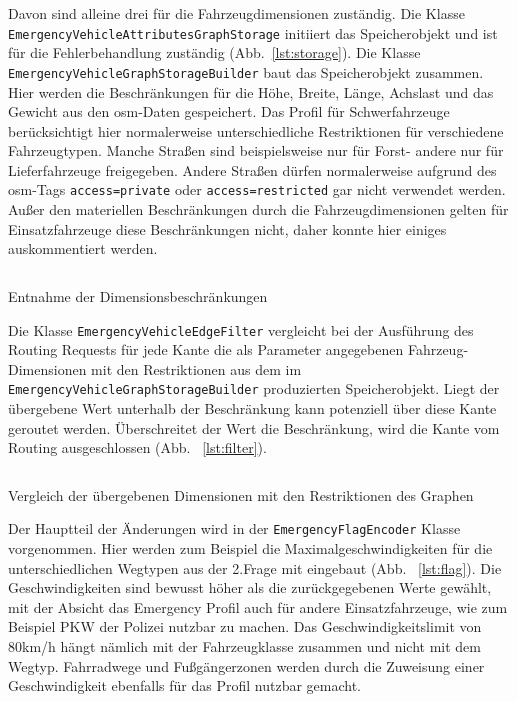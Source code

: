Davon sind alleine drei für die Fahrzeugdimensionen zuständig.
Die Klasse \texttt{EmergencyVehicleAttributesGraphStorage} initiiert das Speicherobjekt und ist für die Fehlerbehandlung zuständig (Abb.~\ref{lst:storage}).
Die Klasse \texttt{EmergencyVehicleGraphStorageBuilder} baut das Speicherobjekt zusammen.
Hier werden die Beschränkungen für die Höhe, Breite, Länge, Achslast und das Gewicht aus den \gls{osm}-Daten gespeichert.
Das Profil für Schwerfahrzeuge berücksichtigt hier normalerweise unterschiedliche Restriktionen für verschiedene Fahrzeugtypen.
Manche Straßen sind beispielsweise nur für Forst- andere nur für Lieferfahrzeuge freigegeben.
Andere Straßen dürfen normalerweise aufgrund des \gls{osm}-Tags \texttt{access=private} oder \texttt{access=restricted} gar nicht verwendet werden.
Außer den materiellen Beschränkungen durch die Fahrzeugdimensionen gelten für Einsatzfahrzeuge diese Beschränkungen nicht, daher konnte hier einiges auskommentiert werden.

\begin{listing}[h]
\centering
{}
\inputminted[gobble=7, fontsize=\footnotesize, breaklines=true, firstline=143, lastline=158]{java}{../data/JavaFiles/EmergencyVehicleGraphStorageBuilder.java}
\caption{Entnahme der Dimensionsbeschränkungen}
\label{lst:builder}
\end{listing}

Die Klasse \texttt{EmergencyVehicleEdgeFilter} vergleicht bei der Ausführung des Routing Requests für jede Kante die als Parameter angegebenen Fahrzeug-Dimensionen mit den Restriktionen aus dem im \texttt{EmergencyVehicleGraphStorageBuilder} produzierten Speicherobjekt.
Liegt der übergebene Wert unterhalb der Beschränkung kann potenziell über diese Kante geroutet werden.
Überschreitet der Wert die Beschränkung, wird die Kante vom Routing ausgeschlossen (Abb. ~\ref{lst:filter}).

\begin{listing}[h]
\centering
{}
\inputminted[gobble=5, fontsize=\footnotesize, breaklines=true, firstline=102, lastline=130]{java}{../data/JavaFiles/EmergencyVehicleEdgeFilter.java}
\caption{Vergleich der übergebenen Dimensionen mit den Restriktionen des Graphen}
\label{lst:filter}
\end{listing}

Der Hauptteil der Änderungen wird in der \texttt{EmergencyFlagEncoder} Klasse vorgenommen.
Hier werden zum Beispiel die Maximalgeschwindigkeiten für die unterschiedlichen Wegtypen aus der 2.Frage mit eingebaut (Abb. ~\ref{lst:flag}).
Die Geschwindigkeiten sind bewusst höher als die zurückgegebenen Werte gewählt, mit der Absicht das Emergency Profil auch für andere Einsatzfahrzeuge, wie zum Beispiel PKW der Polizei nutzbar zu machen.
Das Geschwindigkeitslimit von 80km/h hängt nämlich mit der Fahrzeugklasse zusammen und nicht mit dem Wegtyp.
Fahrradwege und Fußgängerzonen werden durch die Zuweisung einer Geschwindigkeit ebenfalls für das Profil nutzbar gemacht.

